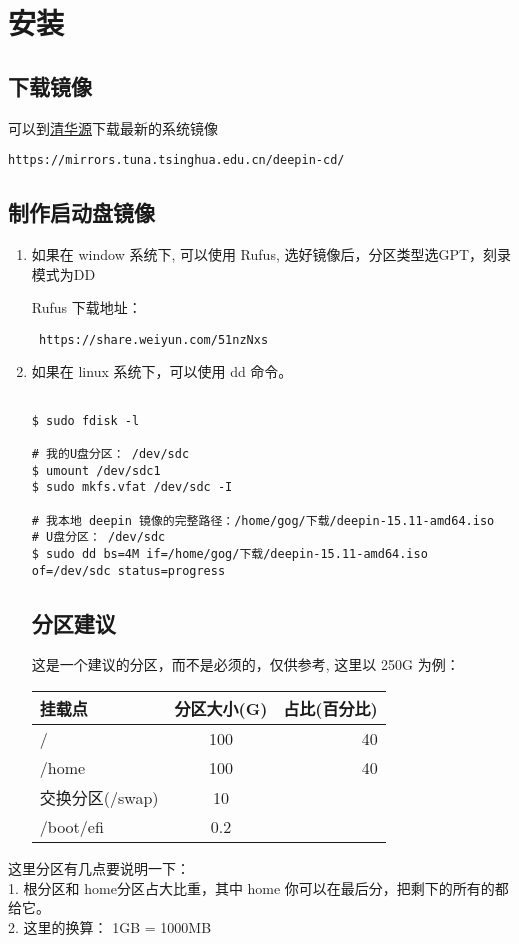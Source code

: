 \section{安装}
\subsection{下载镜像}
可以到\href{https://mirrors.tuna.tsinghua.edu.cn/deepin-cd/}{清华源}下载最新的系统镜像

\begin{lstlisting}
https://mirrors.tuna.tsinghua.edu.cn/deepin-cd/
\end{lstlisting}
\subsection{制作启动盘镜像}
\flushleft
\begin{enumerate}
\item 如果在 window 系统下, 可以使用 Rufus, 选好镜像后，分区类型选GPT，刻录模式为DD

Rufus 下载地址：\\
\begin{lstlisting}
 https://share.weiyun.com/51nzNxs
\end{lstlisting}
\item 如果在 linux 系统下，可以使用 dd 命令。
\begin{lstlisting}

$ sudo fdisk -l 

# 我的U盘分区： /dev/sdc
$ umount /dev/sdc1
$ sudo mkfs.vfat /dev/sdc -I

# 我本地 deepin 镜像的完整路径：/home/gog/下载/deepin-15.11-amd64.iso 
# U盘分区： /dev/sdc
$ sudo dd bs=4M if=/home/gog/下载/deepin-15.11-amd64.iso of=/dev/sdc status=progress
\end{lstlisting}

\subsection{分区建议}
这是一个建议的分区，而不是必须的，仅供参考, 这里以 250G 为例：\\

\begin{tabular}{|l|c|r|}
\hline
 挂载点 & 分区大小(G) & 占比(百分比)\\
\hline
   / & 100 & 40 \\      
\hline
   /home & 100 & 40 \\      
\hline
  交换分区(/swap) & 10 & \\
\hline
  /boot/efi & 0.2 & \\
\hline

\end{tabular}
\end{enumerate}


这里分区有几点要说明一下：\\
1. 根分区和 home分区占大比重，其中 home 你可以在最后分，把剩下的所有的都给它。\\
2. 这里的换算： 1GB = 1000MB  